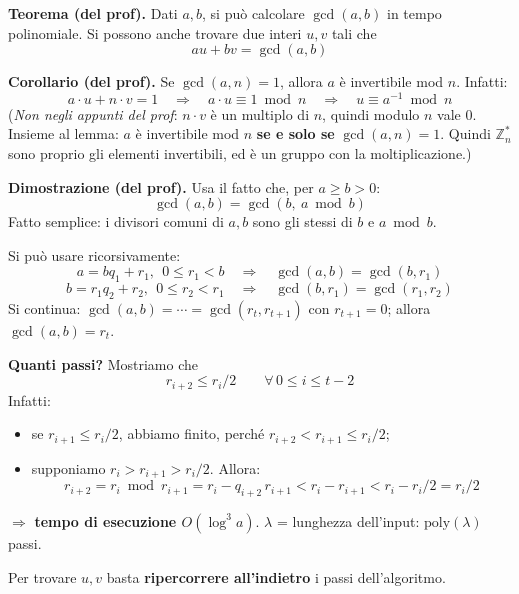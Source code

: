 \textbf{Teorema (del prof).} Dati \(a, b\), si può calcolare \(\gcd(a, b)\) in tempo polinomiale. Si possono anche trovare due interi \(u, v\) tali che
\[
a u + b v = \gcd(a, b)
\]

\textbf{Corollario (del prof).} Se \(\gcd(a, n) = 1\), allora \(a\) è invertibile mod \(n\). Infatti:
\[
a \cdot u + n \cdot v = 1 \quad \Longrightarrow \quad a \cdot u \equiv 1 \bmod n \quad \Longrightarrow \quad u \equiv a^{-1} \bmod n
\]
(\emph{Non negli appunti del prof}: \(n \cdot v\) è un multiplo di \(n\), quindi modulo \(n\) vale \(0\). Insieme al lemma: \(a\) è invertibile mod \(n\) \textbf{se e solo se} \(\gcd(a, n) = 1\). Quindi \(\mathbb{Z}_n^*\) sono proprio gli elementi invertibili, ed è un gruppo con la moltiplicazione.)

\textbf{Dimostrazione (del prof).} Usa il fatto che, per \(a \ge b > 0\):
\[
\gcd(a, b) = \gcd(b,\ a \bmod b)
\]
Fatto semplice: i divisori comuni di \(a, b\) sono gli stessi di \(b\) e \(a \bmod b\).

Si può usare ricorsivamente:
\[
a = b q_1 + r_1, \ \ 0 \le r_1 < b \quad \Rightarrow \quad \gcd(a, b) = \gcd(b, r_1)
\]
\[
b = r_1 q_2 + r_2, \ \ 0 \le r_2 < r_1 \quad \Rightarrow \quad \gcd(b, r_1) = \gcd(r_1, r_2)
\]
Si continua: \(\gcd(a, b) = \cdots = \gcd(r_t, r_{t+1})\) con \(r_{t+1} = 0\); allora \(\gcd(a, b) = r_t\).

\textbf{Quanti passi?} Mostriamo che
\[
r_{i+2} \le r_i / 2 \qquad \forall\, 0 \le i \le t - 2
\]
Infatti:
\begin{itemize}
  \item se \(r_{i+1} \le r_i / 2\), abbiamo finito, perché \(r_{i+2} < r_{i+1} \le r_i / 2\);
  \item supponiamo \(r_i > r_{i+1} > r_i / 2\). Allora:
  \[
  r_{i+2} = r_i \bmod r_{i+1} = r_i - q_{i+2}\, r_{i+1} < r_i - r_{i+1} < r_i - r_i/2 = r_i / 2
  \]
\end{itemize}
\(\Rightarrow\) \textbf{tempo di esecuzione \(O(\log^3 a)\)}. \(\lambda\) = lunghezza dell'input: \(\text{poly}(\lambda)\) passi.

Per trovare \(u, v\) basta \textbf{ripercorrere all'indietro} i passi dell'algoritmo.

